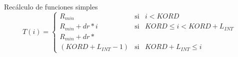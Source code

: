 \documentclass{beamer}
\begin{document}
\begin{frame}{Rec\'alculo de funciones simples}{}
  \begin{displaymath}
    T(i) = \left\lbrace \begin{array}{ccc}
                        R_{min} & \mbox{si} & i < KORD \\
                        R_{min} + dr * i  & \mbox{si} & KORD \leq i < KORD + L_{INT}\\
                        R_{min} + dr *\\ (KORD + L_{INT} - 1) & \mbox{si} & KORD + L_{INT} \leq i
                        \end{array} \right.\,
  \end{displaymath}
\end{frame}
\end{document}
